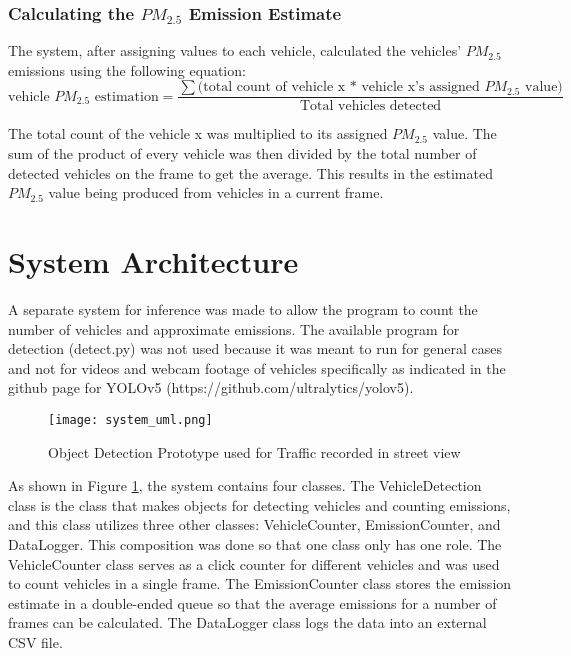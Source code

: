 \subsubsection{Calculating the $PM_{2.5}$ Emission Estimate}

The system, after assigning values to each vehicle, calculated the vehicles’  $PM_{2.5}$ emissions using the following equation:
\begin{equation}
\text{vehicle $PM_{2.5}$ estimation} = \frac{\sum\text{(total count of vehicle x * vehicle x's assigned $PM_{2.5}$ value)}}{\text{Total vehicles detected}}
\end{equation}

The total count of the vehicle x was multiplied to its assigned  $PM_{2.5}$ value. The sum of the product of every vehicle was then divided by the total number of detected vehicles on the frame to get the average. This results in the estimated  $PM_{2.5}$ value being produced from vehicles in a current frame.


\section{System Architecture}

A separate system for inference was made to allow the program to count the number of vehicles and approximate emissions. The available program for detection (detect.py) was not used because it was meant to run for general cases and not for videos and webcam footage of vehicles specifically as indicated in the github page for YOLOv5 (https://github.com/ultralytics/yolov5). 

\begin{figure}[h!]
	\texttt{[image: system\_uml.png]}
	\caption{Object Detection Prototype used for Traffic recorded in street view}
	\label{fig:system_uml}
\end{figure}

As shown in Figure \ref{fig:system_uml}, the system contains four classes. The VehicleDetection class is the class that makes objects for detecting vehicles and counting emissions, and this class utilizes three other classes: VehicleCounter, EmissionCounter, and DataLogger. This composition was done so that one class only has one role. The VehicleCounter class serves as a click counter for different vehicles and was used to count vehicles in a single frame. The EmissionCounter class stores the emission estimate in a double-ended queue so that the average emissions for a number of frames can be calculated. The DataLogger class logs the data into an external CSV file. 

